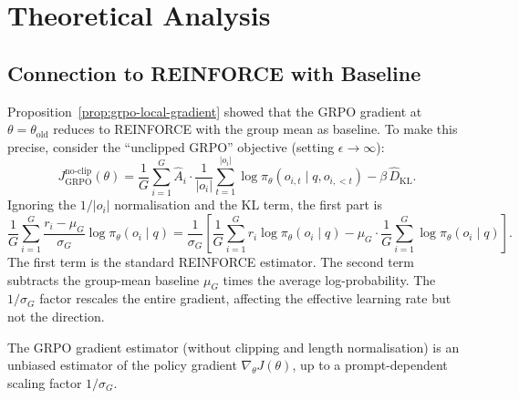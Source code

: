 \section{Theoretical Analysis}
\label{sec:grpo-theory}

\subsection{Connection to REINFORCE with Baseline}

Proposition~\ref{prop:grpo-local-gradient} showed that the GRPO gradient at $\theta = \theta_\mathrm{old}$ reduces to REINFORCE with the group mean as baseline.  To make this precise, consider the ``unclipped GRPO'' objective (setting $\epsilon \to \infty$):
\begin{equation}
\label{eq:grpo-unclipped}
J_{\mathrm{GRPO}}^{\text{no-clip}}(\theta) = \frac{1}{G}\sum_{i=1}^G \hat{A}_i \cdot \frac{1}{|o_i|}\sum_{t=1}^{|o_i|} \log \pi_\theta(o_{i,t} \mid q, o_{i,<t}) - \beta\, \hat{D}_\mathrm{KL}.
\end{equation}
Ignoring the $1/|o_i|$ normalisation and the KL term, the first part is
\[
\frac{1}{G}\sum_{i=1}^G \frac{r_i - \mu_G}{\sigma_G} \log \pi_\theta(o_i \mid q)
= \frac{1}{\sigma_G}\left[\frac{1}{G}\sum_{i=1}^G r_i \log \pi_\theta(o_i \mid q) - \mu_G \cdot \frac{1}{G}\sum_{i=1}^G \log \pi_\theta(o_i \mid q)\right].
\]
The first term is the standard REINFORCE estimator.  The second term subtracts the group-mean baseline $\mu_G$ times the average log-probability.  The $1/\sigma_G$ factor rescales the entire gradient, affecting the effective learning rate but not the direction.

\begin{theorem}
\label{thm:grpo-unbiased}
The GRPO gradient estimator (without clipping and length normalisation) is an unbiased estimator of the policy gradient $\nabla_\theta J(\theta)$, up to a prompt-dependent scaling factor $1/\sigma_G$.
\end{theorem}

